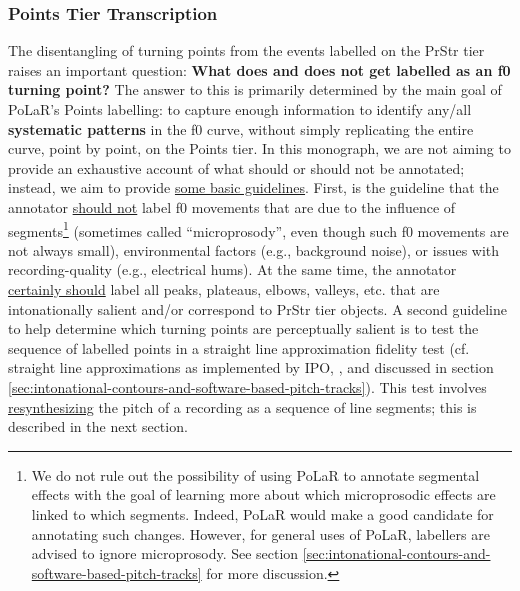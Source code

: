 \documentclass[11pt, twoside]{memoir}
\begin{document}
\subsubsection{Points Tier Transcription}\label{sec:points-tier-transcription}
The disentangling of turning points from the events labelled on the PrStr tier raises an important question: \textbf{What does and does not get labelled as an f0 turning point?} The answer to this is primarily determined by the main goal of PoLaR’s Points labelling: to capture enough information to identify any\slash all \textbf{systematic patterns} in the f0 curve, without simply replicating the entire curve, point by point, on the Points tier.
In this monograph, we are not aiming to provide an exhaustive account of what should or should not be annotated; instead, we aim to provide \uline{some basic guidelines}. First, is the guideline that the annotator \uline{should not} label f0 movements that are due to the influence of segments\footnote{We do not rule out the possibility of using PoLaR to annotate segmental effects with the goal of learning more about which microprosodic effects are linked to which segments. Indeed, PoLaR would make a good candidate for annotating such changes. However, for general uses of PoLaR, labellers are advised to ignore microprosody. See section \ref{sec:intonational-contours-and-software-based-pitch-tracks} for more discussion.} (sometimes called “microprosody”, even though such f0 movements are not always small), environmental factors (e.g., background noise), or issues with recording-quality (e.g., electrical hums). At the same time, the annotator \uline{certainly should} label all peaks, plateaus, elbows, valleys, etc. that are intonationally salient and/or correspond to PrStr tier objects.
A second guideline to help determine which turning points are perceptually salient is to test the sequence of labelled points in a straight line approximation fidelity test (cf. straight line approximations as implemented by IPO, \citealt{t-hart-90}, and discussed in section \ref{sec:intonational-contours-and-software-based-pitch-tracks}). This test involves \uline{resynthesizing} the pitch of a recording as a sequence of line segments; this is described in the next section.
\end{document}
